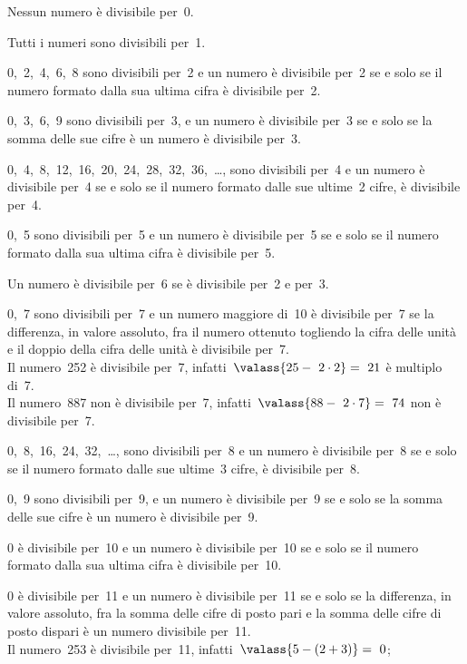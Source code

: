 \begin{description} [noitemsep]
\item[0:~] Nessun numero è divisibile per~0.
\item[1:~] Tutti i numeri sono divisibili per~1.
\item[2:~] 0,~2,~4,~6,~8 sono divisibili per~2 
e un numero è divisibile per~2 se e solo se il numero formato dalla sua 
ultima cifra è divisibile per~2.
\item[3:~] 0,~3,~6,~9 sono divisibili per~3,
e un numero è divisibile per~3 se e solo se la somma delle sue cifre è un 
numero è divisibile per~3.
\item[4:~] 0,~4,~8,~12,~16,~20,~24,~28,~32,~36,~\dots, 
sono divisibili per~4 
e un numero è divisibile per~4 se e solo se il numero formato dalle sue 
ultime~2 cifre, è divisibile per~4.
\item[5:~] 0,~5 sono divisibili per~5 
e un numero è divisibile per~5 se e solo se il numero formato dalla sua 
ultima cifra è divisibile per~5.
\item[6:~] Un numero è divisibile per~6 se è divisibile 
per~2 e per~3.
\item[7:~] 0,~7 sono divisibili per~7 
e un numero maggiore di~10 è divisibile per~7 se la differenza, 
in valore assoluto, fra il numero ottenuto togliendo la cifra delle unità 
e il doppio della cifra delle unità è divisibile per~7.\\
Il numero~252 è divisibile per~7, infatti~\( \valass{25 -~2\cdot 2}=~21\) è 
multiplo di~7.\\
Il numero~887 non è divisibile per~7, infatti~\(\valass{88 -~2\cdot 7}=~74\) 
non è divisibile per~7.
\item[8:~] 0,~8,~16,~24,~32,~\dots, sono 
divisibili per~8 
e un numero è divisibile per~8 se e solo se il numero formato dalle sue 
ultime~3 cifre, è divisibile per~8.
\item[9:~] 0,~9 sono divisibili per~9,
e un numero è divisibile per~9 se e solo se la somma delle sue cifre è un 
numero è divisibile per~9.
\item[10:~] 0 è divisibile per~10 
e un numero è divisibile per~10 se e solo se il numero formato dalla sua 
ultima cifra è divisibile per~10.
\item[11:~] 0 è divisibile per~11
e un numero è divisibile per~11 se e solo se la differenza, 
in valore assoluto, fra la somma delle cifre di posto pari e la somma delle 
cifre di posto dispari è un numero divisibile per~11.\\
Il numero~253 è divisibile per~11, infatti~\(\valass{5-(2+3)} =~0\);\\

\end{description}
